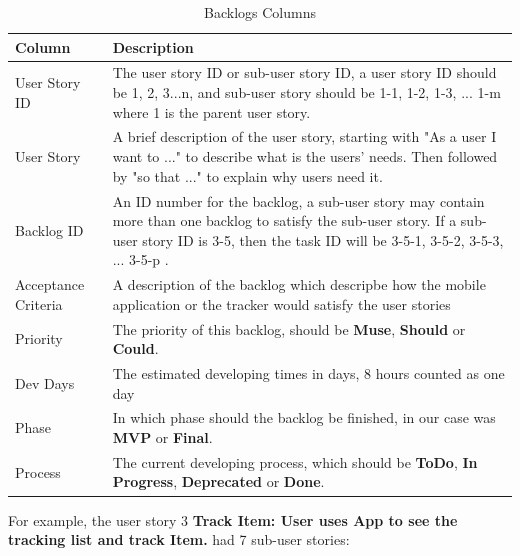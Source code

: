 \documentclass[12pt,a4paper]{article}
\begin{document}
          \begin{table}[H]
            \centering
              \begin{tabularx}{\textwidth}{l X}
                \hline
                Column & Description  \\ \hline
                User Story ID & The user story ID or sub-user story ID, a user story ID should be 1, 2, 3...n, and sub-user story should be 1-1, 1-2, 1-3, ... 1-m  where 1 is the parent user story.\\ 
                User Story & A brief description of the user story, starting with "As a user I want to ..." to describe what is the users' needs. Then followed by "so that ..." to explain why users need it. \\ 
                Backlog ID & An ID number for the backlog, a sub-user story may contain more than one backlog to satisfy the sub-user story. If a sub-user story ID is  3-5, then the task ID will be 3-5-1, 3-5-2, 3-5-3, ... 3-5-p .  \\ 
                Acceptance Criteria & A description of the backlog which descripbe how the mobile application or the tracker would satisfy the user stories \\ 
                Priority & The priority of this backlog, should be {\bf Muse}, {\bf Should} or {\bf Could}. \\                  
                Dev Days & The estimated developing times in days, 8 hours counted as one day \\                  
                Phase & In which phase should the backlog be finished, in our case was {\bf MVP} or {\bf Final}. \\                  
                Process & The current developing process, which should be {\bf ToDo}, {\bf In Progress}, {\bf Deprecated} or {\bf Done}.  \\                  
                \hline
              \end{tabularx}
              \caption[Table caption text]{Backlogs Columns}
              \label{table:Backlogs Column}
          \end{table}
          
          For example, the user story 3 {\bf Track Item: User uses App to see the tracking list and track Item.} had 7 sub-user stories: 
          
\end{document}
